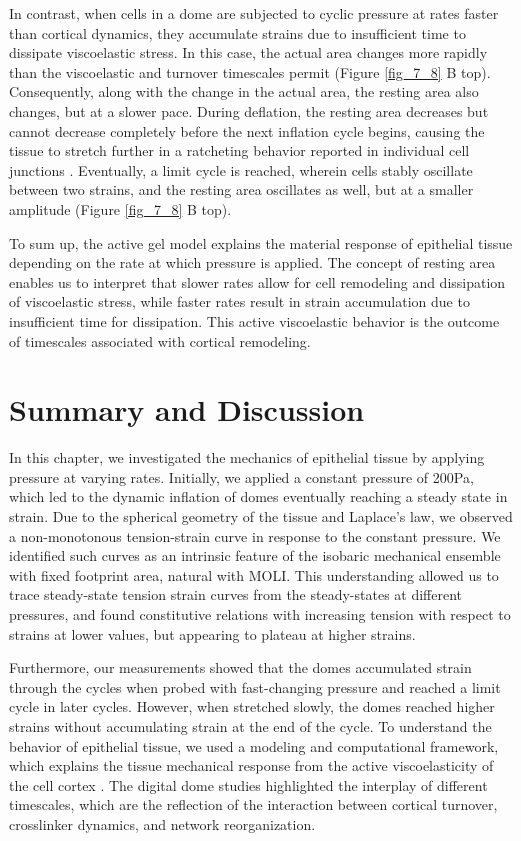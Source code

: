 In contrast, when cells in a dome are subjected to cyclic pressure at rates faster than cortical dynamics, they accumulate strains due to insufficient time to dissipate viscoelastic stress. In this case, the actual area changes more rapidly than the viscoelastic and turnover timescales permit (Figure \ref{fig_7_8} B top). Consequently, along with the change in the actual area, the resting area also changes, but at a slower pace. During deflation, the resting area decreases but cannot decrease completely before the next inflation cycle begins, causing the tissue to stretch further in a ratcheting behavior reported in individual cell junctions \cite{clement2017}. Eventually, a limit cycle is reached, wherein cells stably oscillate between two strains, and the resting area oscillates as well, but at a smaller amplitude (Figure \ref{fig_7_8} B top).

To sum up, the active gel model explains the material response of epithelial tissue depending on the rate at which pressure is applied. The concept of resting area enables us to interpret that slower rates allow for cell remodeling and dissipation of viscoelastic stress, while faster rates result in strain accumulation due to insufficient time for dissipation. This active viscoelastic behavior is the outcome of timescales associated with cortical remodeling.


\hypertarget{summary}{%
	\section{Summary and Discussion}\label{summary}}

In this chapter, we investigated the mechanics of epithelial tissue by applying pressure at varying rates. Initially, we applied a constant pressure of 200Pa, which led to the dynamic inflation of domes eventually reaching a steady state in strain. Due to the spherical geometry of the tissue and Laplace’s law, we observed a non-monotonous tension-strain curve in response to the constant pressure. We identified such curves as an intrinsic feature of the isobaric mechanical ensemble with fixed footprint area, natural with MOLI. This understanding allowed us to trace steady-state tension strain curves from the steady-states at different pressures, and found constitutive relations with increasing tension with respect to strains at lower values, but appearing to plateau at higher strains. 

Furthermore, our measurements showed that the domes accumulated strain through the cycles when probed with fast-changing pressure and reached a limit cycle in later cycles. However, when stretched slowly, the domes reached higher strains without accumulating strain at the end of the cycle. To understand the behavior of epithelial tissue, we used a modeling and computational framework, which explains the tissue mechanical response from the active viscoelasticity of the cell cortex \cite{ouzeri2023}. The digital dome studies highlighted the interplay of different timescales, which are the reflection of the interaction between cortical turnover, crosslinker dynamics, and network reorganization. 

